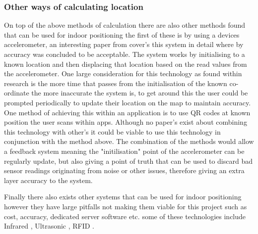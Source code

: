 \subsubsection{Other ways of calculating location}
On top of the above methods of calculation there are also other methods found that can be used for indoor positioning the first of these is by using a devices accelerometer, an interesting paper from \citetemp cover's this system in detail where by accuracy was concluded to be acceptable. The system works by initialising to a known location and then displacing that location based on the read values from the accelerometer. One large consideration for this technology as found within \citetemp research is the more time that passes from the initialisation of the known co-ordinate the more inaccurate the system is, to get around this the user could be prompted periodically to update their location on the map to maintain accuracy. One method of achieving this within an application is to use QR codes at known position the user scans within apps. Although no paper's exist about combining this technology with other's it could be viable to use this technology in conjunction with the method above. The combination of the methods would allow a feedback system meaning the "initilisation" point of the accelerometer can be regularly update, but also giving a point of truth that can be used to discard bad sensor readings originating from noise or other issues, therefore giving an extra layer accuracy to the system.


Finally there also exists other systems that can be used for indoor positioning however they have large pitfalls not making them viable for this project such as cost, accuracy, dedicated server software etc. some of these technologies include Infrared \citetemp, Ultrasonic \citetemp, RFID \citetemp. 
